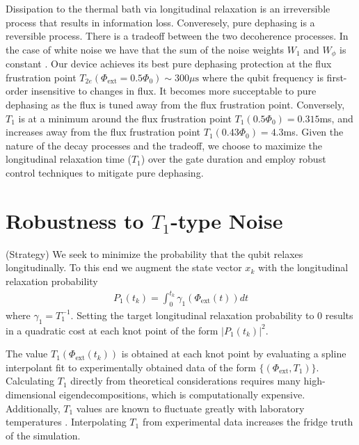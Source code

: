 \documentclass[
  amsfonts,
  amsmath,
  tbtags,
  amssymb,
  aps,
  nobibnotes,
  prl,
  twocolumn,
]{revtex4-2}
\begin{document}
Dissipation to the thermal bath via longitudinal
relaxation is an irreversible process
that results in information loss.
Converesely, pure dephasing is a reversible process.
There is a tradeoff between the two decoherence processes. In the case of white
noise we have that the sum of the noise weights $W_{1}$ and $W_{\phi}$
is constant \cite{huang2020engineering}.
Our device achieves its best pure dephasing
protection at the flux frustration point
$T_{2e}(\Phi_{\textrm{ext}} = 0.5 \Phi_{0}) \sim 300 \mu\textrm{s}$
where the qubit frequency is first-order insensitive to changes in flux.
It becomes more succeptable to pure dephasing as the flux is tuned away from the flux
frustration point. Conversely, $T_{1}$ is at a minimum
around the flux frustration point $T_{1}(0.5 \Phi_{0}) = 0.315$ms,
and increases away from the flux frustration point
$T_{1}(0.43 \Phi_{0}) = 4.3$ms. Given the nature
of the decay processes and the tradeoff, we choose
to maximize the longitudinal relaxation time ($T_{1}$)
over the gate duration
and employ robust control techniques to mitigate
pure dephasing.


\section{Robustness to $T_{1}$-type Noise}
(Strategy) We seek to minimize the probability
that the qubit relaxes longitudinally.
To this end we augment the state vector $x_{k}$ with the
longitudinal relaxation probability
\begin{align}
  P_{1}(t_{k}) = \int_{0}^{t_{k}}
  \gamma_{1}(\Phi_{\textrm{ext}}(t)) dt
\end{align}
where $\gamma_{1} = T_{1}^{-1}$. Setting the target
longitudinal relaxation probability to 0 results in
a quadratic cost at each knot point
of the form ${\lvert P_{1}(t_{k}) \rvert}^{2}$.

The value $T_{1}(\Phi_{\textrm{ext}}(t_{k}))$
is obtained at each knot point by evaluating
a spline interpolant fit to
experimentally obtained data of the form
$\{(\Phi_{\textrm{ext}}, T_{1})\}$.
Calculating $T_{1}$ directly from theoretical
considerations requires many high-dimensional
eigendecompositions, which
is computationally expensive. Additionally,
$T_{1}$ values are known to fluctuate greatly
with laboratory temperatures \cite{klimov2018fluctuations}.
Interpolating $T_{1}$ from experimental data increases
the fridge truth of the simulation.
\end{document}
